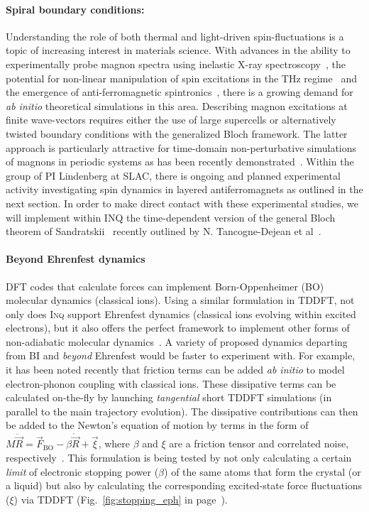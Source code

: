 \paragraph{Spiral boundary conditions:}
Understanding the role of both thermal and light-driven spin-fluctuations is a topic of increasing interest in materials science. With advances in the ability to experimentally probe magnon spectra using inelastic X-ray spectroscopy~\cite{Haverkort2010}, the potential for non-linear manipulation of spin excitations in the THz regime~\cite{Kampfrath2011} and the emergence of anti-ferromagnetic spintronics~\cite{Baltz2018}, there is a growing demand for \textit{ab initio} theoretical simulations in this area. Describing magnon excitations at finite wave-vectors requires either the use of large supercells or alternatively twisted boundary conditions with the generalized Bloch framework. The latter approach is particularly attractive for time-domain non-perturbative simulations of magnons in periodic systems as has been recently demonstrated~\cite{Tancogne-Dejean2020}. Within the group of PI Lindenberg at SLAC, there is ongoing and planned experimental activity investigating spin dynamics in layered antiferromagnets as outlined in the next section. In order to make direct contact with these experimental studies, we will implement within \textsc{INQ} the time-dependent version of the general Bloch theorem of Sandratskii~\cite{Sandratskii1986} recently outlined by N. Tancogne-Dejean et al~\cite{Tancogne-Dejean2020}. 

\paragraph{Beyond Ehrenfest dynamics}

DFT codes that calculate forces can implement Born-Oppenheimer (BO) molecular dynamics (classical ions).
Using a similar formulation in TDDFT, not only does \textsc{Inq} support Ehrenfest dynamics (classical ions evolving within excited electrons), but it also offers the perfect framework to implement other forms of non-adiabatic molecular dynamics~\cite{Tapavicza2013,Curchod2018}. 
A variety of proposed dynamics departing from BI and \emph{beyond} Ehrenfest would be faster to experiment with.
For example, it has been noted recently that friction terms can be added \emph{ab initio} to model electron-phonon coupling with classical ions.
These dissipative terms can be calculated on-the-fly by launching \emph{tangential} short TDDFT simulations (in parallel to the main trajectory evolution).
The dissipative contributions can then be added to the Newton's equation of motion by terms in the form of \(M \ddot{\vec{R}} = \vec{F}_\text{BO} - \beta\dot{\vec{R}} + \vec{\xi}\), where \(\beta\) and \(\xi\) are a friction tensor and correlated noise, respectively~\cite{Tamm2018}.
This formulation is being tested by not only calculating a certain \emph{limit} of electronic stopping power (\(\beta\)) of the same atoms that form the crystal (or a liquid) but also by calculating the corresponding excited-state force fluctuations (\(\xi\)) via TDDFT (Fig.~\ref{fig:stopping_eph} in page~\pageref{fig:stopping_eph}).\label{page:stopping_eph}



